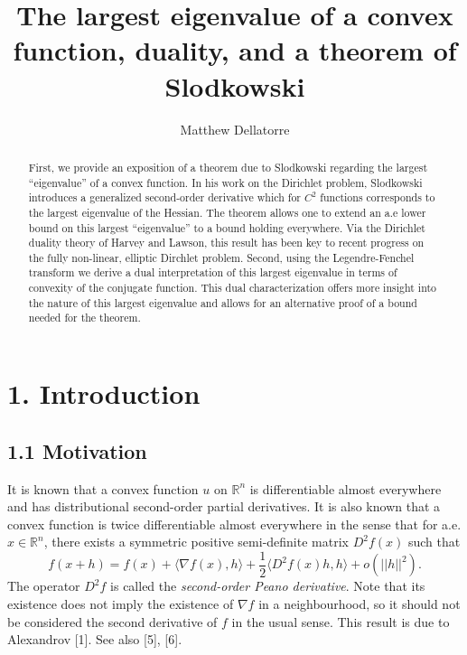 \documentclass[10pt]{article}
\title{The largest eigenvalue of a convex function, duality, and a theorem of Slodkowski}
\author{Matthew Dellatorre}
\date{ }
\begin{document}
\maketitle
\begin{abstract}
First, we provide an exposition of a theorem due to Slodkowski regarding the largest \textquotedblleft eigenvalue\textquotedblright \hspace{.5mm} of a convex function. In his work on the Dirichlet problem, Slodkowski introduces a generalized second-order derivative which for $C^2$ functions corresponds to the largest eigenvalue of the Hessian. The theorem allows one to extend an a.e lower bound on this largest \textquotedblleft eigenvalue\textquotedblright \hspace{.5mm} to a bound holding everywhere. Via the Dirichlet duality theory of Harvey and Lawson, this result has been key to recent progress on the fully non-linear, elliptic Dirchlet problem.
Second, using the Legendre-Fenchel transform we derive a dual interpretation of this largest eigenvalue in terms of convexity of the conjugate function. This dual characterization offers more insight into the nature of this largest eigenvalue and allows for an alternative proof of a bound needed for the theorem.
\end{abstract}
\tableofcontents {}
\section{1. Introduction}
\subsection{1.1 Motivation}
It is known that a convex function $u$ on $\mathbb{R}^n$ is differentiable almost everywhere and has distributional second-order partial derivatives. It is also known that a convex function is twice differentiable almost everywhere in the sense that for a.e. $x\in \mathbb{R}^n$, there exists a symmetric positive semi-definite matrix $D^2f(x)$ such that
$$f(x+h)=f(x)+\langle\nabla f(x), h\rangle + \frac{1}{2} \langle D^2f(x)h,h\rangle+ o(||h||^2). $$
The operator $D^2f$ is called the \textit{second-order Peano derivative}. Note that its existence does not imply the existence of $\nabla f$ in a neighbourhood, so it should not be considered the second derivative of $f$ in the usual sense. This result is due to Alexandrov [1]. See also [5], [6].
\end{document}
